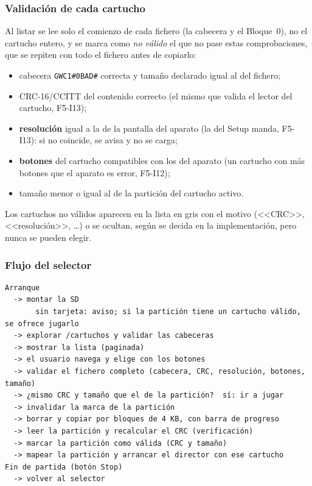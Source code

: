 \subsubsection{Validación de cada cartucho}

Al listar se lee solo el comienzo de cada fichero (la cabecera y el Bloque~0), no el cartucho entero, y se marca como \emph{no válido} el que no pase estas comprobaciones, que se repiten con todo el fichero antes de copiarlo:

\begin{itemize}
	\item cabecera \texttt{GWC1\#0BAD\#} correcta y tamaño declarado igual al del fichero;
	\item CRC-16/CCITT del contenido correcto (el mismo que valida el lector del cartucho, F5-I13);
	\item \textbf{resolución} igual a la de la pantalla del aparato (la del Setup manda, F5-I13): si no coincide, se avisa y no se carga;
	\item \textbf{botones} del cartucho compatibles con los del aparato (un cartucho con más botones que el aparato es error, F5-I12);
	\item tamaño menor o igual al de la partición del cartucho activo.
\end{itemize}

Los cartuchos no válidos aparecen en la lista en gris con el motivo (<<CRC>>, <<resolución>>, \ldots) o se ocultan, según se decida en la implementación, pero nunca se pueden elegir.

\subsubsection{Flujo del selector}

\begin{verbatim}
Arranque
  -> montar la SD
       sin tarjeta: aviso; si la partición tiene un cartucho válido, se ofrece jugarlo
  -> explorar /cartuchos y validar las cabeceras
  -> mostrar la lista (paginada)
  -> el usuario navega y elige con los botones
  -> validar el fichero completo (cabecera, CRC, resolución, botones, tamaño)
  -> ¿mismo CRC y tamaño que el de la partición?  sí: ir a jugar
  -> invalidar la marca de la partición
  -> borrar y copiar por bloques de 4 KB, con barra de progreso
  -> leer la partición y recalcular el CRC (verificación)
  -> marcar la partición como válida (CRC y tamaño) 
  -> mapear la partición y arrancar el director con ese cartucho
Fin de partida (botón Stop)
  -> volver al selector
\end{verbatim}

